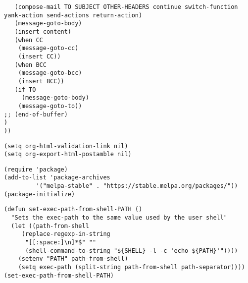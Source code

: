 \documentclass[11pt]{article}
\begin{document}
\begin{verbatim}
   (compose-mail TO SUBJECT OTHER-HEADERS continue switch-function yank-action send-actions return-action)
   (message-goto-body)
   (insert content)
   (when CC
    (message-goto-cc)
    (insert CC))
   (when BCC
    (message-goto-bcc)
    (insert BCC))
   (if TO
     (message-goto-body)
    (message-goto-to))
;; (end-of-buffer)
)
))
\end{verbatim}
\label{sec:orged5448a}
\begin{verbatim}
(setq org-html-validation-link nil)
(setq org-export-html-postamble nil)
\end{verbatim}
\label{sec:orgcd23e90}
\begin{verbatim}
(require 'package)
(add-to-list 'package-archives
	     '("melpa-stable" . "https://stable.melpa.org/packages/"))
(package-initialize)
\end{verbatim}
\label{sec:org32500f5}
\begin{verbatim}
(defun set-exec-path-from-shell-PATH ()
  "Sets the exec-path to the same value used by the user shell"
  (let ((path-from-shell
	 (replace-regexp-in-string
	  "[[:space:]\n]*$" ""
	  (shell-command-to-string "${SHELL} -l -c 'echo ${PATH}'"))))
    (setenv "PATH" path-from-shell)
    (setq exec-path (split-string path-from-shell path-separator))))
(set-exec-path-from-shell-PATH)
\end{verbatim}
\end{document}

